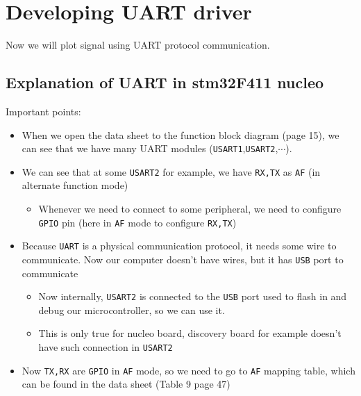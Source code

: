 \documentclass[12pt,a4paper]{book}
\begin{document}
\begin{itemize}
\end{itemize}

\newpage

\section{Developing UART driver}

Now we will plot signal using UART protocol communication.

\subsection{Explanation of UART in stm32F411 nucleo}
\label{sub:Explanation of UART}

Important points:

\begin{itemize}

 \item When we open the data sheet to the function block diagram (page 15), we can see that we have many UART modules (\verb|USART1|,\verb|USART2|,$\cdots$).

\item We can see that at some \verb|USART2| for example, we have \verb|RX,TX| as \verb|AF| (in alternate function mode)

    \begin{itemize}
        \item Whenever we need to connect to some peripheral, we need to configure \verb|GPIO| pin (here in \verb|AF| mode to configure \verb|RX,TX|)
        
    \end{itemize}

\item  Because \verb|UART| is a physical communication protocol, it needs some wire to communicate. Now our computer doesn't have wires, but it has \verb|USB| port to communicate

    \begin{itemize}
        \item Now internally, \verb|USART2| is connected to the \verb|USB| port used to flash in and debug our microcontroller, so we can use it.

        \item  This is only true for nucleo board, discovery board for example doesn't have such connection in \verb|USART2|
    \end{itemize}


\item  Now \verb|TX,RX| are \verb|GPIO| in \verb|AF| mode, so we need to go to \verb|AF| mapping table, which can be found in the data sheet (Table 9 page 47)


\end{itemize}
\end{document}
